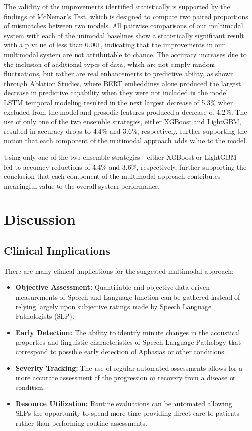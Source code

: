 \documentclass[conference]{IEEEtran}
\begin{document}
The validity of the improvements identified statistically is supported by the findings of McNemar's Test, which is designed to compare two paired proportions of mismatches between two models. All pairwise comparisons of our multimodal system with each of the unimodal baselines show a statistically significant result with a p value of less than 0.001, indicating that the improvements in our multimodal system are not attributable to chance. The accuracy increases due to the inclusion of additional types of data, which are not simply random fluctuations, but rather are real enhancements to predictive ability, as shown through Ablation Studies, where BERT embeddings alone produced the largest decrease in predictive capability when they were not included in the model. LSTM temporal modeling resulted in the next largest decrease of 5.3\% when excluded from the model and prosodic features produced a decrease of 4.2\%. The use of only one of the two ensemble strategies, either XGBoost and LightGBM, resulted in accuracy drops to 4.4\% and 3.6\%, respectively, further supporting the notion that each component of the mutimodal approach adds value to the model.


Using only one of the two ensemble strategies---either XGBoost or LightGBM---led to accuracy reductions of 4.4\% and 3.6\%, respectively, further supporting the conclusion that each component of the multimodal approach contributes meaningful value to the overall system performance.


\section{Discussion}

\subsection{Clinical Implications}

There are many clinical implications for the suggested multimodal approach:
\begin{itemize}
\item \textbf{Objective Assessment:} Quantifiable and objective data-driven measurements of Speech and Language function can be gathered instead of relying largely upon subjective ratings made by Speech Language Pathologists (SLP).
\item \textbf{Early Detection:} The ability to identify minute changes in the acoustical properties and linguistic characteristics of Speech Language Pathology that correspond to possible early detection of Aphasias or other conditions.
\item \textbf{Severity Tracking:} The use of regular automated assessments allows for a more accurate assessment of the progression or recovery from a disease or condition.
\item \textbf{Resource Utilization:} Routine evaluations can be automated allowing SLPs the opportunity to spend more time providing direct care to patients rather than performing routine assessments.
\end{itemize}
\end{document}
